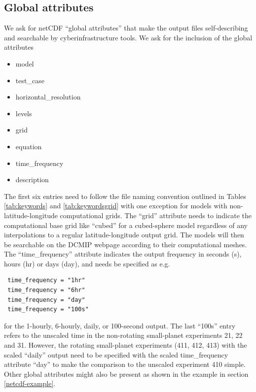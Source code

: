 \documentclass[times,doublespace]{fldauth}
\begin{document}
{\begin{appendix}
\subsection{Global attributes}
We ask for netCDF ``global attributes'' that make the output files self-describing and searchable by cyberinfrastructure tools. We ask for the inclusion of the global attributes
\begin{itemize}
\item model
\item test\_case
\item horizontal\_resolution
\item levels
\item grid
\item equation
\item time\_frequency
\item description
\end{itemize}
The first six entries need to follow the file naming convention outlined in Tables \ref{tab:keywords} and \ref{tab:keywordsgrid} with one exception for models with non-latitude-longitude computational grids. The ``grid'' attribute needs to indicate the computational base grid like ``cubed'' for a cubed-sphere model regardless of any interpolations to a regular latitude-longitude output grid. The models will then be searchable on the DCMIP webpage according to their computational meshes.
The ``time\_frequency'' attribute indicates the output frequency in seconds (s), hours (hr) or days (day), and needs be specified as e.g.
\begin{verbatim}
 time_frequency = "1hr"
 time_frequency = "6hr"
 time_frequency = "day"
 time_frequency = "100s"
 \end{verbatim}
for the 1-hourly, 6-hourly, daily, or 100-second output. The last ``100s'' entry refers to the unscaled time in the non-rotating small-planet experiments 21, 22 and 31. However, the rotating small-planet experiments (411, 412, 413) with the scaled ``daily'' output need to be specified with the scaled time\_frequency attribute ``day'' to make the comparison to the unscaled experiment 410 simple.
Other global attributes might also be present as shown in the example in section \ref{netcdf-example}.


\end{appendix}}
\end{document}

